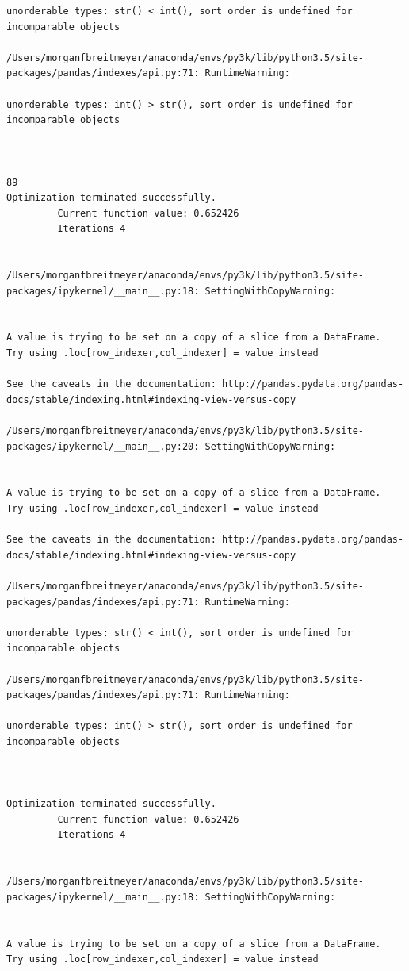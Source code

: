 \begin{lstlisting}
unorderable types: str() < int(), sort order is undefined for incomparable objects

/Users/morganfbreitmeyer/anaconda/envs/py3k/lib/python3.5/site-packages/pandas/indexes/api.py:71: RuntimeWarning:

unorderable types: int() > str(), sort order is undefined for incomparable objects



89
Optimization terminated successfully.
         Current function value: 0.652426
         Iterations 4


/Users/morganfbreitmeyer/anaconda/envs/py3k/lib/python3.5/site-packages/ipykernel/__main__.py:18: SettingWithCopyWarning:


A value is trying to be set on a copy of a slice from a DataFrame.
Try using .loc[row_indexer,col_indexer] = value instead

See the caveats in the documentation: http://pandas.pydata.org/pandas-docs/stable/indexing.html#indexing-view-versus-copy

/Users/morganfbreitmeyer/anaconda/envs/py3k/lib/python3.5/site-packages/ipykernel/__main__.py:20: SettingWithCopyWarning:


A value is trying to be set on a copy of a slice from a DataFrame.
Try using .loc[row_indexer,col_indexer] = value instead

See the caveats in the documentation: http://pandas.pydata.org/pandas-docs/stable/indexing.html#indexing-view-versus-copy

/Users/morganfbreitmeyer/anaconda/envs/py3k/lib/python3.5/site-packages/pandas/indexes/api.py:71: RuntimeWarning:

unorderable types: str() < int(), sort order is undefined for incomparable objects

/Users/morganfbreitmeyer/anaconda/envs/py3k/lib/python3.5/site-packages/pandas/indexes/api.py:71: RuntimeWarning:

unorderable types: int() > str(), sort order is undefined for incomparable objects



Optimization terminated successfully.
         Current function value: 0.652426
         Iterations 4


/Users/morganfbreitmeyer/anaconda/envs/py3k/lib/python3.5/site-packages/ipykernel/__main__.py:18: SettingWithCopyWarning:


A value is trying to be set on a copy of a slice from a DataFrame.
Try using .loc[row_indexer,col_indexer] = value instead


\end{lstlisting}

